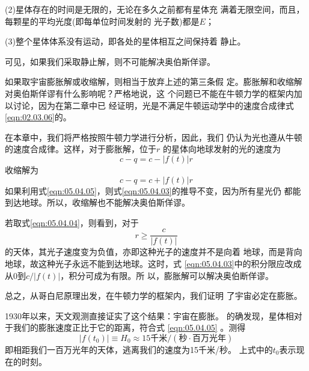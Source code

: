 (2)星体存在的时间是无限的，无论在多久之前都有星体充
满着无限空间，而且，每颗星的平均光度(即每单位时间发射的
光子数)都是$ E $；

(3)整个星体体系没有运动，即各处的星体相互之间保持着
静止。

可见，如果我们采取静止解，则不可能解决奥伯斯佯谬。

如果取宇宙膨胀解或收缩解，则相当于放弃上述的第三条假
定。膨胀解和收缩解对奥伯斯佯谬有什么影响呢？严格地说，这
个问题已不能在牛顿力学的框架内加以讨论，因为在第二章中已
经证明，光是不满足牛顿运动学中的速度合成律式\lhbrak \eqref{eqn:02.03.06}\rhbrak 的。

在本章中，我们将严格按照牛顿力学进行分析，因此，我们
仍认为光也遵从牛顿的速度合成律。这样，对于膨胀解，位于$ r $
的星体向地球发射的光的速度为
\begin{equation}\label{eqn:05.04.04}
  c - q = c - | f \left( t \right) | r
\end{equation}
收缩解为
\begin{equation}\label{eqn:05.04.05}
  c - q = c + | f \left( t \right) | r
\end{equation}
如果利用式\eqref{eqn:05.04.05}，则式\eqref{eqn:05.04.03}的推导不变，因为所有星光仍
都能到达地球。所以，收缩解也不能解决奥伯斯佯谬。

若取式\eqref{eqn:05.04.04}，则看到，对于
\begin{equation*}
  r \geqslant \frac { c } { | f \left( t \right) | }
\end{equation*}
的天体，其光子速度变为负值，亦即这种光子的速度并不是向着
地球，而是背向地球，故这种光子永远不能到达地球。这时，式
\eqref{eqn:05.04.03}中的积分限应改成从0到$ c / \left| f \left( t \right) \right| $，积分可成为有限。所
以，膨胀解可以解决奥伯断佯谬。

总之，从哥白尼原理出发，在牛顿力学的框架内，我们证明
了宇宙必定在膨胀。

1930年以来，天文观测直接证实了这个结果：宇宙在膨胀。
的确发现，星体相对于我们的膨胀速度正比于它的距离，符合式
\eqref{eqn:05.04.05} 。测得
\begin{equation}\label{eqn:05.04.06}
  \left| f \left( t _ { 0 } \right) \right| \equiv H _ { 0 } \approx 15 \text{千米}/(\text{秒}\cdot\!\text{百万光年})
\end{equation}
即相距我们一百万光年的天体，逃离我们的速度为15千米/秒。
上式中的$ t _ 0 $表示现在的时刻。
